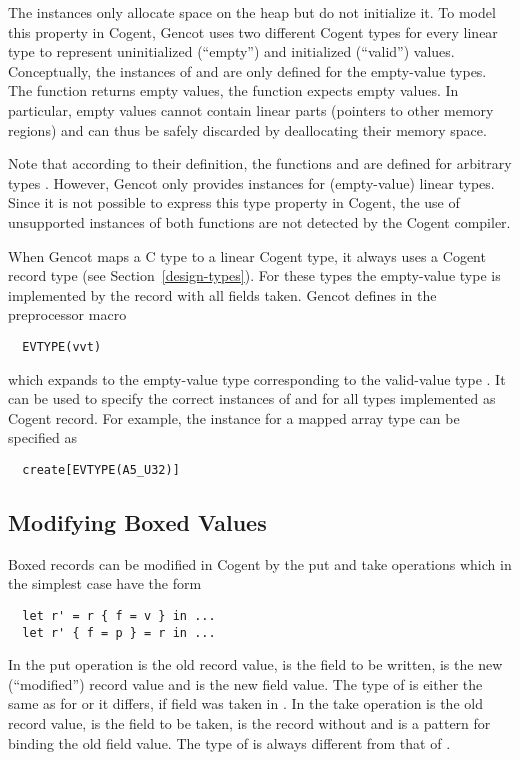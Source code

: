 The  instances only allocate space on the heap but do not initialize it. To model this property in 
Cogent, Gencot uses two different Cogent types for every linear type to represent uninitialized (``empty'') and 
initialized (``valid'') values.
Conceptually, the instances of  and  are only defined for the empty-value types.
The function  returns empty values, the function  expects empty values. In particular,
empty values cannot contain linear parts (pointers to other memory regions) and can thus be safely discarded by 
deallocating their memory space. 

Note that according to their definition, the functions  and  are defined for arbitrary
types . However, Gencot only provides instances for (empty-value) linear types. Since it is not possible
to express this type property in Cogent, the use of unsupported instances of both functions are not detected by the 
Cogent compiler.

When Gencot maps a C type to a linear Cogent type, it always uses a Cogent record type (see Section~\ref{design-types}).
For these types the empty-value type is implemented by the record with all fields taken. Gencot defines in 
 the preprocessor macro
\begin{verbatim}
  EVTYPE(vvt)
\end{verbatim}
which expands to the empty-value type  corresponding to the valid-value type . 
It can be used to specify the correct
instances of  and  for all types implemented as Cogent record. For example, the 
 instance for a mapped array type  can be specified as
\begin{verbatim}
  create[EVTYPE(A5_U32)]
\end{verbatim}

\subsection{Modifying Boxed Values}
\label{design-operations-modify}

Boxed records can be modified in Cogent by the put and take operations which in the simplest case have the form
\begin{verbatim}
  let r' = r { f = v } in ...
  let r' { f = p } = r in ...
\end{verbatim}
In the put operation  is the old record value,  is the field to be written,  is the 
new (``modified'') record value and  is the new field value. The type of  is either the same as 
for  or it differs, if field  was taken in . In the take operation  is the old record value,  
is the field to be taken,  is the record without  and  is a pattern for binding the old 
field value. The type of  is always different from that of .

